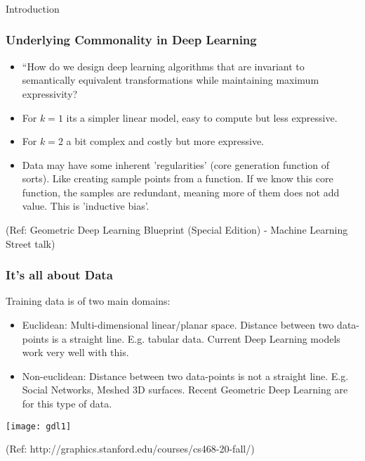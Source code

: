 \begin{frame}[fragile]\frametitle{}
\begin{center}
{\Large Introduction}
\end{center}
\end{frame}

\begin{frame}[fragile]\frametitle{Underlying Commonality in Deep Learning}


\begin{itemize}

\item ``How do we design deep learning algorithms that are invariant to semantically equivalent transformations while maintaining maximum expressivity?
\item For $k=1$ its a simpler linear model, easy to compute but less expressive.
\item For $k=2$ a bit complex and costly but more expressive.
\item Data may have some inherent 'regularities' (core generation function of sorts). Like creating sample points from a function. If we know this core function, the samples are redundant, meaning more of them does not add value. This is 'inductive bias'.
\end{itemize}
	  
{\tiny (Ref: Geometric Deep Learning Blueprint (Special Edition) - Machine Learning Street talk)}

\end{frame}


\begin{frame}[fragile]\frametitle{It's all about Data}

Training data is of two main domains:
\begin{itemize}
\item Euclidean: Multi-dimensional linear/planar space. Distance between two data-points is a straight line. E.g. tabular data. Current Deep Learning models work very well with this.
\item Non-euclidean: Distance between two data-points is not a straight line. E.g. Social Networks, Meshed 3D surfaces. Recent Geometric Deep Learning are for this type of data.
\end{itemize}
	  
\begin{center}
\texttt{[image: gdl1]}
\end{center}

{\tiny (Ref: http://graphics.stanford.edu/courses/cs468-20-fall/)}

\end{frame}


